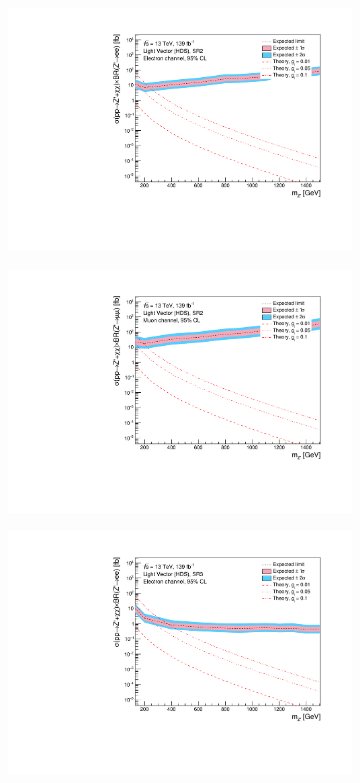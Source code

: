 \documentclass[12pt, a4paper]{book}
\begin{document}
\begin{figure}[!ht]
\begin{subfigure}[b]{0.49\textwidth}
      \includegraphics[width=1\textwidth]{Limits/Model_independent/100-150/LV_HDS/mass_exclusion_ee.pdf}
   \end{subfigure}
   \hfill
   \begin{subfigure}[b]{0.49\textwidth}
      \centering
      \includegraphics[width=1\textwidth]{Limits/Model_independent/100-150/LV_HDS/mass_exclusion_uu.pdf}
   \end{subfigure}
   \hfill
	\begin{subfigure}[b]{0.49\textwidth}
      \centering
      \includegraphics[width=1\textwidth]{Limits/Model_independent/150/LV_HDS/mass_exclusion_ee.pdf}

\end{subfigure}
\end{figure}
\end{document}
